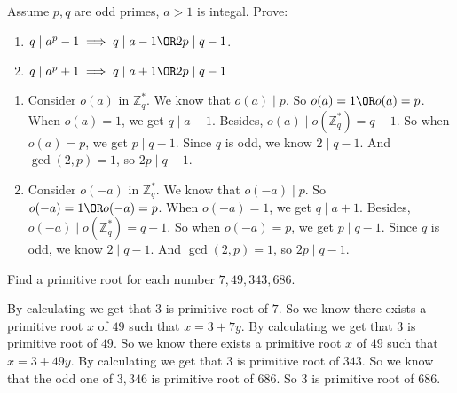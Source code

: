 \documentclass{ctexart}
\newif\ifpreface
\begin{document}
\large
\setlength{\baselineskip}{1.2em}
\ifpreface
  
  \newgeometry{left=2cm,right=2cm,top=2cm,bottom=2cm}
\else
  \maketitle \fi
\begin{problem}\label{pro:1}
  Assume \(p,q\) are odd primes, \(a > 1\) is integal.
  Prove:
  \begin{enumerate}
    \item \(q \mid a^p-1 \implies q \mid a-1 \OR 2p \mid q-1\).
    \item \(q \mid a^p +1\implies q \mid a+1 \OR 2p \mid q-1\)
  \end{enumerate}
\end{problem}
\begin{solution}
  \begin{enumerate}
    \item Consider \(o(a)\) in \(\mathbb{Z}_q^{*}\). We know that \(o(a) \mid p\).
      So \(o(a)=1 \OR o(a) = p\). When \(o(a)=1\), we get \(q \mid a-1\).
      Besides, \(o(a) \mid o(\mathbb{Z}_q^{*})=q-1\).
      So when \(o(a)=p\), we get \(p \mid q-1\).
      Since \(q\) is odd, we know \(2 \mid q-1\). And \(\gcd(2,p)=1\), so \(2p \mid q-1\).
    \item Consider \(o(-a)\) in \(\mathbb{Z}_q^{*}\). We know that \(o(-a) \mid p\).
      So \(o(-a)=1 \OR o(-a) = p\). When \(o(-a)=1\), we get \(q \mid a+1\).
      Besides, \(o(-a) \mid o(\mathbb{Z}_q^{*})=q-1\).
      So when \(o(-a)=p\), we get \(p \mid q-1\).
      Since \(q\) is odd, we know \(2 \mid q-1\). And \(\gcd(2,p)=1\), so \(2p \mid q-1\).
  \end{enumerate}
\end{solution}

\begin{problem}\label{pro:2}
  Find a primitive root for each number \(7,49,343,686\).
\end{problem}
\begin{solution}
  By calculating we get that \(3\) is primitive root of \(7\).
  So we know there exists a primitive root \(x\) of \(49\) such that \(x=3+7y\).
  By calculating we get that \(3\) is primitive root of \(49\).
  So we know there exists a primitive root \(x\) of \(49\) such that \(x=3+49y\).
  By calculating we get that \(3\) is primitive root of \(343\).
  So we know that the odd one of \(3,346\) is primitive root of \(686\).
  So \(3\) is primitive root of \(686\).
\end{solution}
\end{document}

